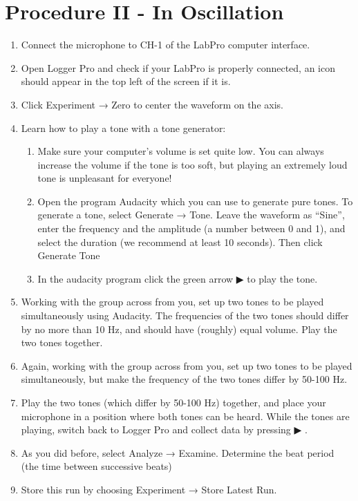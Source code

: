 \section{{Procedure II - In Oscillation}}

{}

\begin{enumerate}
	\item {Connect the microphone to CH-1 of the LabPro computer interface.}
	\item {Open Logger Pro and check if your LabPro is properly connected, an icon should appear in the top left of the screen if it is.}
	\item {Click Experiment → Zero to center the waveform on the axis.}
	\item {Learn how to play a tone with a tone generator:}
	\begin{enumerate}
		\item {Make sure your computer’s volume is set quite low. You can always increase the volume if the tone is too soft, but playing an extremely loud tone is unpleasant for everyone!}
		\item {Open the program Audacity which you can use to generate pure tones. To generate a tone, select Generate → Tone. Leave the waveform as “Sine”, enter the frequency and the amplitude (a number between 0 and 1), and select the duration (we recommend at least 10 seconds). Then click Generate Tone }
		\item {In the audacity program click the green arrow ▶ to play the tone.}
	\end{enumerate}
	\item {Working with the group across from you, set up two tones to be played simultaneously using Audacity. The frequencies of the two tones should differ by no more than 10 Hz, and should have (roughly) equal volume. Play the two tones together.}
	\item {Again, working with the group across from you, set up two tones to be played simultaneously, but make the frequency of the two tones differ by 50-100 Hz.}
	\item {Play the two tones (which differ by 50-100 Hz) together, and place your microphone in a position where both tones can be heard. While the tones are playing, switch back to Logger Pro and collect data by pressing ▶ .}
	\item {As you did before, select Analyze → Examine. Determine the beat period (the time between successive beats)}
	\item {Store this run by choosing Experiment → Store Latest Run.}
\end{enumerate}


